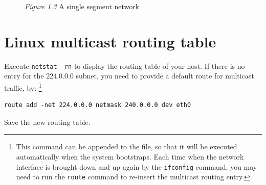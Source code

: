 \documentclass{../UTNetLab}
\begin{document}
    \begin{minipage}{0.48\textwidth}
        \begin{flushright}
            \begin{figure}[H]
                \centering
                \caption{\textit{Figure 1.3} A single segment network}
                \label{fig:fig13}
            \end{figure}
        \end{flushright}
    \end{minipage}

\section{Linux multicast routing table}
\label{sec:linux-multicast-routing}
    Execute \lstinline{netstat -rn} to display the routing table of your host.
    If there is no entry for the 224.0.0.0 subnet, you need to provide a default route for multicast traffic, by:
    \footnote{This command can be appended to the  file, so that it will be executed automatically when the system bootstraps. Each time when the network interface is brought down and up again by the \lstinline{ifconfig} command, you may need to run the \lstinline{route} command to re-insert the multicast routing entry.}
    \begin{lstlisting}
route add -net 224.0.0.0 netmask 240.0.0.0 dev eth0
    \end{lstlisting}
    Save the new routing table.
    
\end{document}
